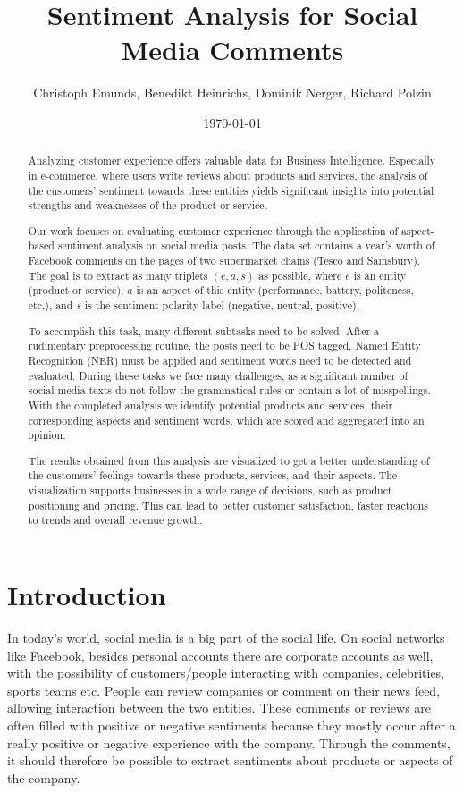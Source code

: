 \documentclass[10pt,a4paper]{article}
\title{\Huge{Sentiment Analysis for Social Media Comments}}
\author{Christoph Emunds, Benedikt Heinrichs, Dominik Nerger, Richard Polzin}
\date{\today}
\begin{document}
	\maketitle
	\thispagestyle{empty}
	\begin{abstract}
	Analyzing customer experience offers valuable data for Business Intelligence. Especially in e-commerce, where users write reviews about products and services, the analysis of the customers' sentiment towards these entities yields significant insights into potential strengths and weaknesses of the product or service.

	Our work focuses on evaluating customer experience through the application of aspect-based sentiment analysis on social media posts. The data set contains a year's worth of Facebook comments on the pages of two supermarket chains (Tesco and Sainsbury). The goal is to extract as many triplets $(e, a, s)$ as possible, where $e$ is an entity (product or service), $a$ is an aspect of this entity (performance, battery, politeness, etc.), and $s$ is the sentiment polarity label (negative, neutral, positive).

	To accomplish this task, many different subtasks need to be solved. After a rudimentary preprocessing routine, the posts need to be POS tagged, Named Entity Recognition (NER) must be applied and sentiment words need to be detected and evaluated. During these tasks we face many challenges, as a significant number of social media texts do not follow the grammatical rules or contain a lot of misspellings. With the completed analysis we identify potential products and services, their corresponding aspects and sentiment words, which are scored and aggregated into an opinion.

	The results obtained from this analysis are visualized to get a better understanding of the customers' feelings towards these products, services, and their aspects. The visualization supports businesses in a wide range of decisions, such as product positioning and pricing. This can lead to better customer satisfaction, faster reactions to trends and overall revenue growth.
	\end{abstract}
	
	\newpage
	\tableofcontents
	\thispagestyle{empty}
	\newpage
	\clearpage
	\setcounter{page}{1}
	\section{Introduction}
	In today's world, social media is a big part of the social life. On social networks like Facebook, besides personal accounts there are corporate accounts as well, with the possibility of customers/people interacting with companies, celebrities, sports teams etc.
	People can review companies or comment on their news feed, allowing interaction between the two entities. These comments or reviews are often filled with positive or negative sentiments because they mostly occur after a really positive or negative experience with the company. Through the comments, it should therefore be possible to extract sentiments about products or aspects of the company.
\end{document}
